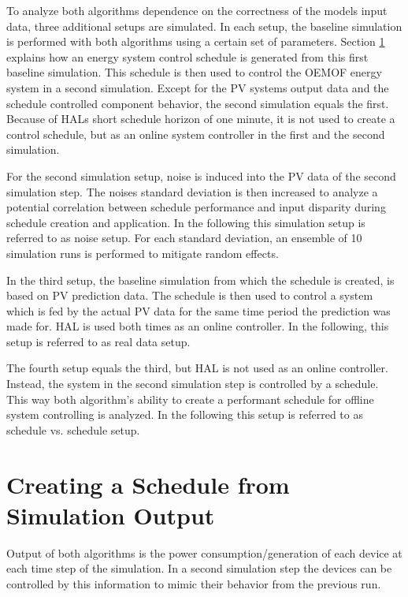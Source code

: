 \documentclass[a4paper,12pt]{book}
\theoremstyle{break}
\begin{document}
To analyze both algorithms dependence on the correctness of the models input data, three additional setups are simulated.
In each setup, the baseline simulation is performed with both algorithms using a certain set of parameters.
Section \ref{s/meth/schedule} explains how an energy system control schedule is generated from this first baseline simulation.
This schedule is then used to control the \ac{OEMOF} energy system in a second simulation.
Except for the \ac{PV} systems output data and the schedule controlled component behavior, the second simulation equals the first.
Because of HALs short schedule horizon of one minute, it is not used to create a control schedule, but as an online system controller in the first and the second simulation.

For the second simulation setup, noise is induced into the \ac{PV} data of the second simulation step. The noises standard deviation is then increased to analyze a potential correlation between schedule performance and input disparity during schedule creation and application. In the following this simulation setup is referred to as noise setup. For each standard deviation, an ensemble of 10 simulation runs is performed to mitigate random effects.

In the third setup, the baseline simulation from which the schedule is created, is based on \ac{PV} prediction data. The schedule is then used to control a system which is fed by the actual \ac{PV} data for the same time period the prediction was made for. HAL is used both times as an online controller. In the following, this setup is referred to as real data setup.

The fourth setup equals the third, but HAL is not used as an online controller. Instead, the system in the second simulation step is controlled by a schedule. This way both algorithm's ability to create a performant schedule for offline system controlling is analyzed. In the following this setup is referred to as schedule vs. schedule setup.

\section{Creating a Schedule from Simulation Output}\label{s/meth/schedule}
Output of both algorithms is the power consumption/generation of each device at each time step of the simulation.
In a second simulation step the devices can be controlled by this information to mimic their behavior from the previous run.
\end{document}
